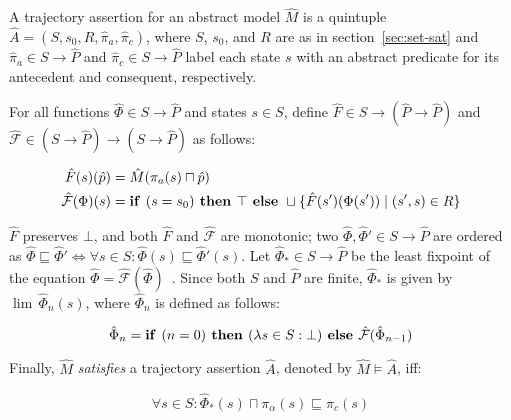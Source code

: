 A trajectory assertion for an abstract model $\hat M$ is a quintuple $\hat A = (S, s_{0}, R, \hat{\pi}_{a}, \hat{\pi}_{c})$, where $S$, $s_{0}$, and $R$ are as in section~\ref{sec:set-sat} and $\hat{\pi}_{a} \in S \rightarrow \hat P$ and $\hat{\pi}_{c} \in S \rightarrow \hat P$ label each state $s$ with an abstract predicate for its antecedent and consequent, respectively.

For all functions $\hat \Phi \in S \rightarrow \hat P$ and states $s \in S$, define $\hat F \in S \rightarrow (\hat P \rightarrow \hat P)$ and $\hat{\mathcal{F}} \in (S \rightarrow \hat P) \rightarrow (S \rightarrow \hat P)$ as follows:

\begin{align}
\hat F(s)(\hat p) &= \hat M(\pi_{a}(s) \sqcap \hat p) \\
\hat{\mathcal{F}}(\Phi)(s) &= \textrm{\textbf{if }} (s = s_{0}) \textrm{\textbf{ then }} \top \textrm{\textbf{ else }} \sqcup \{ \hat F(s')(\Phi(s')) \mid (s',s) \in R \}
\end{align}

\noindent $\hat F$ preserves $\bot$, and both $\hat F$ and $\hat{\mathcal{F}}$ are monotonic; two $\hat \Phi, \hat \Phi' \in S \rightarrow \hat P$ are ordered as $\hat \Phi \sqsubseteq \hat \Phi' \iff \forall s \in S : \hat \Phi(s) \sqsubseteq \hat \Phi'(s)$. Let $\hat \Phi_{*} \in S \rightarrow \hat P$ be the least fixpoint of the equation $\hat \Phi = \hat{\mathcal{F}}(\hat \Phi)$~\cite{davey2002}. Since both $S$ and $\hat P$ are finite, $\hat \Phi_{*}$ is given by $\lim \, \hat \Phi_{n}(s)$, where $\hat \Phi_{n}$ is defined as follows:

\begin{equation}
\hat \Phi_{n} = \textrm{\textbf{if }} (n = 0) \textrm{\textbf{ then }} (\lambda s \in S : \bot) \textrm{\textbf{ else }} \hat{\mathcal{F}}(\hat \Phi_{n-1})
\end{equation}

\noindent Finally, $\hat M$ \textit{satisfies} a trajectory assertion $\hat A$\footnotemark, denoted by $\hat M \models \hat A$, iff:

\begin{equation}
\forall s \in S : \hat \Phi_{*}(s) \sqcap \pi_{\alpha}(s) \sqsubseteq \pi_{c}(s)
\end{equation}

